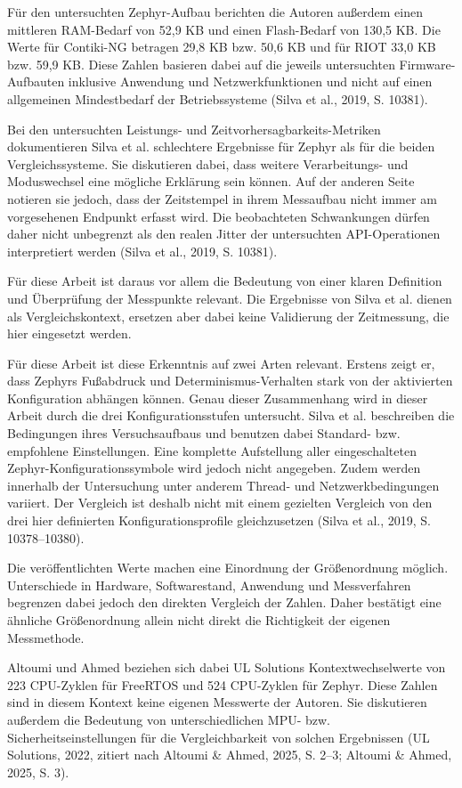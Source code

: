 Für den untersuchten Zephyr-Aufbau berichten die Autoren außerdem einen mittleren RAM-Bedarf von 52,9 KB und einen Flash-Bedarf von 130,5 KB. Die Werte für Contiki-NG betragen 29,8 KB bzw. 50,6 KB und für RIOT 33,0 KB bzw. 59,9 KB. Diese Zahlen basieren dabei auf die jeweils untersuchten Firmware-Aufbauten inklusive Anwendung und Netzwerkfunktionen und nicht auf einen allgemeinen Mindestbedarf der Betriebssysteme (Silva et al., 2019, S. 10381).

Bei den untersuchten Leistungs- und Zeitvorhersagbarkeits-Metriken dokumentieren Silva et al. schlechtere Ergebnisse für Zephyr als für die beiden Vergleichssysteme. Sie diskutieren dabei, dass weitere Verarbeitungs- und Moduswechsel eine mögliche Erklärung sein können. Auf der anderen Seite notieren sie jedoch, dass der Zeitstempel in ihrem Messaufbau nicht immer am vorgesehenen Endpunkt erfasst wird. Die beobachteten Schwankungen dürfen daher nicht unbegrenzt als den realen Jitter der untersuchten API-Operationen interpretiert werden (Silva et al., 2019, S. 10381).

Für diese Arbeit ist daraus vor allem die Bedeutung von einer klaren Definition und Überprüfung der Messpunkte relevant. Die Ergebnisse von Silva et al. dienen als Vergleichskontext, ersetzen aber dabei keine Validierung der Zeitmessung, die hier eingesetzt werden.

Für diese Arbeit ist diese Erkenntnis auf zwei Arten relevant. Erstens zeigt er, dass Zephyrs Fußabdruck und Determinismus-Verhalten stark von der aktivierten Konfiguration abhängen können. Genau dieser Zusammenhang wird in dieser Arbeit durch die drei Konfigurationsstufen untersucht. Silva et al. beschreiben die Bedingungen ihres Versuchsaufbaus und benutzen dabei Standard- bzw. empfohlene Einstellungen. Eine komplette Aufstellung aller eingeschalteten Zephyr-Konfigurationssymbole wird jedoch nicht angegeben. Zudem werden innerhalb der Untersuchung unter anderem Thread- und Netzwerkbedingungen variiert. Der Vergleich ist deshalb nicht mit einem gezielten Vergleich von den drei hier definierten Konfigurationsprofile gleichzusetzen (Silva et al., 2019, S. 10378–10380).

Die veröffentlichten Werte machen eine Einordnung der Größenordnung möglich. Unterschiede in Hardware, Softwarestand, Anwendung und Messverfahren begrenzen dabei jedoch den direkten Vergleich der Zahlen. Daher bestätigt eine ähnliche Größenordnung allein nicht direkt die Richtigkeit der eigenen Messmethode.

Altoumi und Ahmed beziehen sich dabei UL Solutions Kontextwechselwerte von 223 CPU-Zyklen für FreeRTOS und 524 CPU-Zyklen für Zephyr. Diese Zahlen sind in diesem Kontext keine eigenen Messwerte der Autoren. Sie diskutieren außerdem die Bedeutung von unterschiedlichen MPU- bzw. Sicherheitseinstellungen für die Vergleichbarkeit von solchen Ergebnissen (UL Solutions, 2022, zitiert nach Altoumi \& Ahmed, 2025, S. 2–3; Altoumi \& Ahmed, 2025, S. 3).

